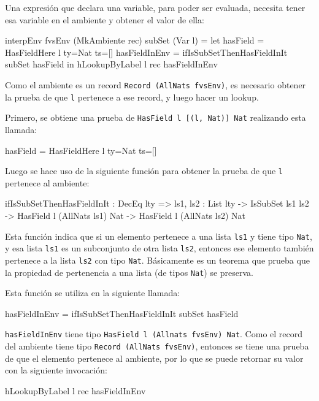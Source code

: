 Una expresión que declara una variable, para poder ser evaluada, necesita tener esa variable en el ambiente y obtener el valor de ella:

\begin{code}
interpEnv {fvsEnv} (MkAmbiente rec) subSet (Var l) =
  let hasField = HasFieldHere {l} {ty=Nat} {ts=[]}
    hasFieldInEnv = ifIsSubSetThenHasFieldInIt subSet hasField
  in hLookupByLabel l rec hasFieldInEnv
\end{code}

Como el ambiente es un record \texttt{Record (AllNats fvsEnv)}, es necesario obtener la prueba de que \texttt{l} pertenece a ese record, y luego hacer un lookup.

Primero, se obtiene una prueba de \texttt{HasField l [(l, Nat)] Nat} realizando esta llamada:

\begin{code}
hasField = HasFieldHere {l} {ty=Nat} {ts=[]}
\end{code}

Luego se hace uso de la siguiente función para obtener la prueba de que \texttt{l} pertenece al ambiente:

\begin{code}
ifIsSubSetThenHasFieldInIt : DecEq lty => {ls1, ls2 : List lty} ->
  IsSubSet ls1 ls2 -> HasField l (AllNats ls1) Nat ->
  HasField l (AllNats ls2) Nat
\end{code}

Esta función indica que si un elemento pertenece a una lista \texttt{ls1} y tiene tipo \texttt{Nat}, y esa lista \texttt{ls1} es un subconjunto de otra lista \texttt{ls2}, entonces ese elemento también pertenece a la lista \texttt{ls2} con tipo \texttt{Nat}. Básicamente es un teorema que prueba que la propiedad de pertenencia a una lista (de tipos \texttt{Nat}) se preserva.

Esta función se utiliza en la siguiente llamada:

\begin{code}
hasFieldInEnv = ifIsSubSetThenHasFieldInIt subSet hasField
\end{code}

\texttt{hasFieldInEnv} tiene tipo \texttt{HasField l (Allnats fvsEnv) Nat}. Como el record del ambiente tiene tipo \texttt{Record (AllNats fvsEnv)}, entonces se tiene una prueba de que el elemento pertenece al ambiente, por lo que se puede retornar su valor con la siguiente invocación:

\begin{code}
hLookupByLabel l rec hasFieldInEnv
\end{code}

